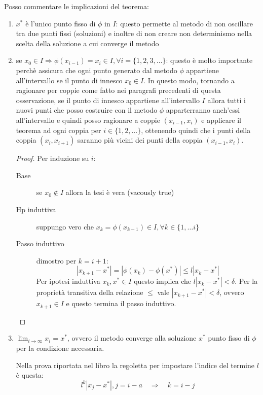 \begin{oss}
Posso commentare le implicazioni del teorema:
\begin{enumerate}
  \item $x^{*}$ \`e l'unico punto fisso di $\phi$ in $I$: questo permette al
  metodo di non oscillare tra due punti fissi (soluzioni) e inoltre di non
  creare non determinismo nella scelta della soluzione a cui converge il metodo
  \item se $x_{0} \in I \Rightarrow \phi(x_{i-1}) = x_{i} \in I, \forall i =
  \{1, 2, 3, \ldots\}$: questo \`e molto importante perch\`e assicura che ogni
  punto generato dal metodo $\phi$ appartiene all'intervallo se il punto di
  innesco $x_{0} \in I$. In questo modo, tornando a ragionare per coppie come
  fatto nei paragrafi precedenti di questa osservazione, se il punto di innesco
  appartiene all'intervallo $I$ allora tutti i nuovi punti che posso costruire
  con il metodo $\phi$ apparterranno anch'essi all'intervallo e quindi posso 
  ragionare a coppie $(x_{i-1}, x_{i})$ e applicare il teorema ad ogni coppia
  per $i \in \{ 1, 2,\ldots \}$, ottenendo quindi che i punti della coppia
  $(x_{i}, x_{i+1})$ saranno pi\`u vicini dei punti della coppia $(x_{i-1},
  x_{i})$.
  \begin{proof}
  	Per induzione su $i$: 
  	\begin{description}
  	  \item[Base] se $x_{0} \not \in I$ allora la tesi \`e vera (vacously true)
  	  \item[Hp induttiva] suppungo vero che $x_{k} = \phi(x_{k-1})\in I, \forall
  	  k \in \{1, \ldots i\}$
  	  \item[Passo induttivo] dimostro per $k = i + 1$:
  	  \begin{displaymath}
  	  	|x_{k+1} - x^{*} | = |\phi(x_{k}) - \phi(x^{*} ) | \leq l |x_{k} - x^{*} | 
  	  \end{displaymath}
  	  Per ipotesi induttiva $x_{k}, x^{*} \in I$ questo implica che $l |x_{k} -
  	  x^{*}| < \delta$. Per la propriet\`a transitiva della relazione $\leq$ vale
  	  $|x_{k+1} - x^{*} | < \delta$, ovvero $x_{k+1} \in I$ e questo termina il
  	  passo induttivo.
  	\end{description}
  \end{proof}
  
  \item $\lim_{i \rightarrow \infty}{x_{i}} = x^{*}$, ovvero il metodo converge
  alla soluzione $x^{*}$ punto fisso di $\phi$ per la condizione necessaria.
  
  Nella prova riportata nel libro la regoletta per impostare l'indice del
  termine $l$ \`e questa: 
  \begin{displaymath}
  	l^{k}|x_{j } - x^{*}|, j = i - a \quad \Rightarrow \quad k = i - j
  \end{displaymath}
\end{enumerate}
\end{oss}

